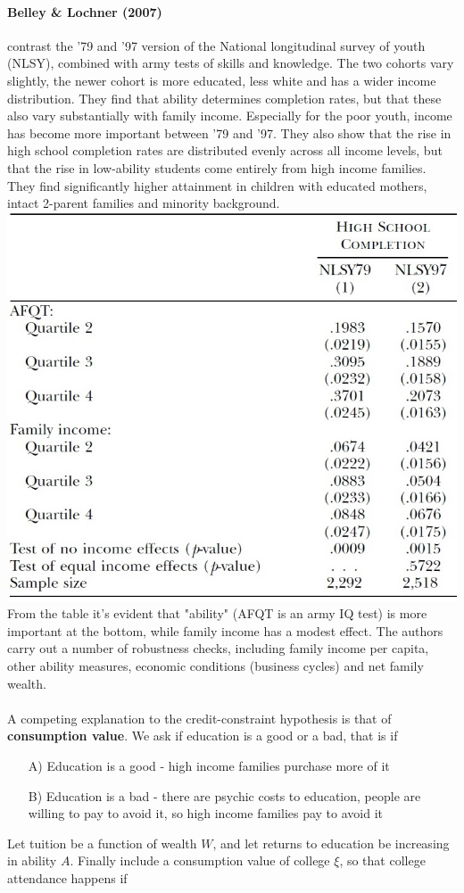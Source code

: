 \documentclass[12pt, a4paper]{article}
\begin{document}
\begin{multicols}{2}
\paragraph{Belley \& Lochner (2007)} contrast the '79 and '97 version of the National longitudinal survey of youth (NLSY), combined with army tests of skills and knowledge. The two cohorts vary slightly, the newer cohort is more educated, less white and has a wider income distribution. They find that ability determines completion rates, but that these also vary substantially with family income. Especially for the poor youth, income has become more important between '79 and '97. They also show that the rise in high school completion rates are distributed evenly across all income levels, but that the rise in low-ability students come entirely from high income families. They find significantly higher attainment in children with educated mothers, intact 2-parent families and minority background. 
\includegraphics[width = 0.45 \textwidth]{belleyL.jpg}
From the table it's evident that "ability" (AFQT is an army IQ test) is more important at the bottom, while family income has a modest effect. 
The authors carry out a number of robustness checks, including family income per capita, other ability measures, economic conditions (business cycles) and net family wealth. 
\\ \\ 
A competing explanation to the credit-constraint hypothesis is that of \textbf{consumption value}. We ask if education is a good or a bad, that is if 
\begin{itemize}
\item[A)] Education is a good - high income families purchase more of it
\item[B)] Education is a bad - there are psychic costs to education, people are willing to pay to avoid it, so high income families pay to avoid it
\end{itemize}
Let tuition be a function of wealth $W$, and let returns to education be increasing in ability $A$. Finally include a consumption value of college $\xi$, so that college attendance happens if 

\end{multicols}
\end{document}

